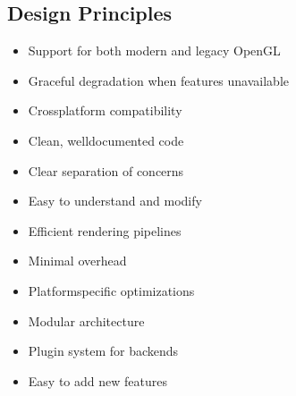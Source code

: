 \documentclass[a4paper,10pt,english,openany,oneside]{sphinxmanual}
\begin{document}
\subsection{Design Principles}
\label{\detokenize{development:design-principles}}\begin{description}
\begin{itemize}
\item {} 
\sphinxAtStartPar
Support for both modern and legacy OpenGL

\item {} 
\sphinxAtStartPar
Graceful degradation when features unavailable

\item {} 
\sphinxAtStartPar
Cross\sphinxhyphen{}platform compatibility

\end{itemize}

\begin{itemize}
\item {} 
\sphinxAtStartPar
Clean, well\sphinxhyphen{}documented code

\item {} 
\sphinxAtStartPar
Clear separation of concerns

\item {} 
\sphinxAtStartPar
Easy to understand and modify

\end{itemize}

\begin{itemize}
\item {} 
\sphinxAtStartPar
Efficient rendering pipelines

\item {} 
\sphinxAtStartPar
Minimal overhead

\item {} 
\sphinxAtStartPar
Platform\sphinxhyphen{}specific optimizations

\end{itemize}

\begin{itemize}
\item {} 
\sphinxAtStartPar
Modular architecture

\item {} 
\sphinxAtStartPar
Plugin system for backends

\item {} 
\sphinxAtStartPar
Easy to add new features

\end{itemize}

\end{description}
\end{document}
